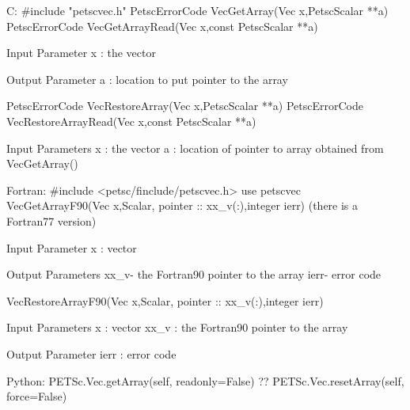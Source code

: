 C:
#include "petscvec.h"
PetscErrorCode VecGetArray(Vec x,PetscScalar **a)
PetscErrorCode VecGetArrayRead(Vec x,const PetscScalar **a)

Input Parameter
x : the vector

Output Parameter
a : location to put pointer to the array

PetscErrorCode VecRestoreArray(Vec x,PetscScalar **a)
PetscErrorCode VecRestoreArrayRead(Vec x,const PetscScalar **a)

Input Parameters
x : the vector
a : location of pointer to array obtained from VecGetArray()

Fortran:
#include <petsc/finclude/petscvec.h>
use petscvec
VecGetArrayF90(Vec x,{Scalar, pointer :: xx_v(:)},integer ierr)
(there is a Fortran77 version)

Input Parameter
x : vector

Output Parameters
xx_v- the Fortran90 pointer to the array
ierr- error code

VecRestoreArrayF90(Vec x,{Scalar, pointer :: xx_v(:)},integer ierr)

Input Parameters
x : vector
xx_v : the Fortran90 pointer to the array

Output Parameter
ierr : error code 

Python:
PETSc.Vec.getArray(self, readonly=False)
?? PETSc.Vec.resetArray(self, force=False)
